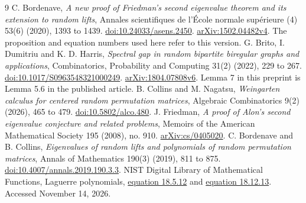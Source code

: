 \documentclass[11pt]{article}
\theoremstyle{definition}
\theoremstyle{remark}
\newcommand{\1}{\mathbf 1}
\begin{document}
\begin{thebibliography}{9}
C. Bordenave, \emph{A new proof of Friedman's second eigenvalue theorem and its extension to random lifts}, Annales scientifiques de l'\'Ecole normale sup\'erieure (4) 53(6) (2020), 1393 to 1439.
\href{https://doi.org/10.24033/asens.2450}{doi:10.24033/asens.2450}.
\href{https://arxiv.org/abs/1502.04482v4}{arXiv:1502.04482v4}. The proposition and equation numbers used here refer to this version.
G. Brito, I. Dumitriu and K. D. Harris, \emph{Spectral gap in random bipartite biregular graphs and applications}, Combinatorics, Probability and Computing 31(2) (2022), 229 to 267.
\href{https://doi.org/10.1017/S0963548321000249}{doi:10.1017/S0963548321000249}.
\href{https://arxiv.org/abs/1804.07808v6}{arXiv:1804.07808v6}. Lemma 7 in this preprint is Lemma 5.6 in the published article.
B. Collins and M. Nagatsu, \emph{Weingarten calculus for centered random permutation matrices}, Algebraic Combinatorics 9(2) (2026), 465 to 479.
\href{https://doi.org/10.5802/alco.480}{doi:10.5802/alco.480}.
J. Friedman, \emph{A proof of Alon's second eigenvalue conjecture and related problems}, Memoirs of the American Mathematical Society 195 (2008), no. 910.
\href{https://arxiv.org/abs/cs/0405020}{arXiv:cs/0405020}.
C. Bordenave and B. Collins, \emph{Eigenvalues of random lifts and polynomials of random permutation matrices}, Annals of Mathematics 190(3) (2019), 811 to 875.
\href{https://doi.org/10.4007/annals.2019.190.3.3}{doi:10.4007/annals.2019.190.3.3}.
NIST Digital Library of Mathematical Functions, Laguerre polynomials,
\href{https://dlmf.nist.gov/18.5.E12}{equation 18.5.12} and
\href{https://dlmf.nist.gov/18.12.E13}{equation 18.12.13}. Accessed November 14, 2026.
\end{thebibliography}
\end{document}
